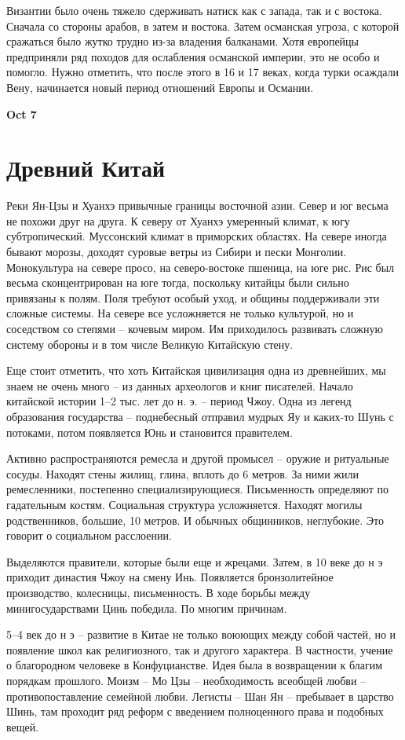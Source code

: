 \documentclass[a4paper, 12pt]{article}
\def\dateis#1{\vspace{\baselineskip}\hfill\textbf{#1}\par}
\begin{document}
\begin{multicols}{2}
Византии было очень тяжело сдерживать натиск как с запада, так и с востока. Сначала со стороны арабов, в затем и востока. Затем османская угроза, с которой сражаться было жутко трудно из-за владения балканами. Хотя европейцы предприняли ряд походов для ослабления османской империи, это не особо и помогло. Нужно отметить, что после этого в 16 и 17 веках, когда турки осаждали Вену, начинается новый период отношений Европы и Османии. 

\dateis{Oct 7}
\section{Древний Китай}
Реки Ян-Цзы и Хуанхэ привычные границы восточной азии. Север и юг весьма не похожи друг на друга. К северу от Хуанхэ умеренный климат, к югу субтропический. Муссонский климат в приморских областях. На севере иногда бывают морозы, доходят суровые ветры из Сибири и пески Монголии. Монокультура на севере просо, на северо-востоке пшеница, на юге рис. Рис был весьма сконцентрирован на юге тогда, поскольку китайцы были сильно привязаны к полям. Поля требуют особый уход, и общины поддерживали эти сложные системы. На севере все усложняется не только культурой, но и соседством со степями -- кочевым миром. Им приходилось развивать сложную систему обороны и в том числе Великую Китайскую стену. 

Еще стоит отметить, что хоть Китайская цивилизация одна из древнейших, мы знаем не очень много -- из данных археологов и книг писателей. Начало китайской истории 1--2 тыс. лет до н. э. -- период Чжоу. Одна из легенд образования государства -- поднебесный отправил мудрых Яу и каких-то Шунь с потоками, потом появляется Юнь и становится правителем. 

Активно распространяются ремесла и другой промысел -- оружие и ритуальные сосуды. Находят стены жилищ, глина, вплоть до 6 метров. За ними жили ремесленники, постепенно специализирующиеся. Письменность определяют по гадательным костям. Социальная структура усложняется. Находят могилы родственников, большие, 10 метров. И обычных общинников, неглубокие. Это говорит о социальном расслоении. 

Выделяются правители, которые были еще и жрецами. Затем, в 10 веке до н э приходит династия Чжоу на смену Инь. Появляется бронзолитейное производство, колесницы, письменность. В ходе борьбы между минигосударствами Цинь победила. По многим причинам. 

5--4 век до н э -- развитие в Китае не только воюющих между собой частей, но и появление школ как религиозного, так и другого характера. В частности, учение о благородном человеке в Конфуцианстве. Идея была в возвращении к благим порядкам прошлого. Моизм -- Мо Цзы -- необходимость всеобщей любви -- противопоставление семейной любви. Легисты -- Шан Ян -- пребывает в царство Шинь, там проходит ряд реформ с введением полноценного права и подобных вещей. 


\end{multicols}
\end{document}

